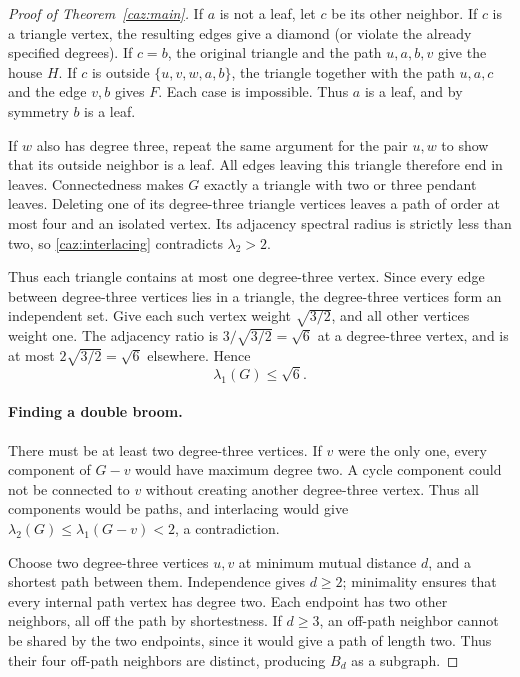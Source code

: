 \documentclass[11pt,a4paper]{article}
\numberwithin{equation}{section}
\theoremstyle{remark}
\begin{document}
\begin{proof}[Proof of Theorem~\ref{caz:main}]
If $a$ is not a leaf, let $c$ be its other neighbor. If $c$ is a
triangle vertex, the resulting edges give a diamond (or violate
the already specified degrees). If $c=b$, the original triangle
and the path $u,a,b,v$ give the house $H$. If $c$ is outside
$\{u,v,w,a,b\}$, the triangle together with the path $u,a,c$
and the edge $v,b$ gives $F$. Each case is impossible. Thus $a$
is a leaf, and by symmetry $b$ is a leaf.

If $w$ also has degree three, repeat the same argument for the
pair $u,w$ to show that its outside neighbor is a leaf. All edges
leaving this triangle therefore end in leaves. Connectedness
makes $G$ exactly a triangle with two or three pendant leaves.
Deleting one of its degree-three triangle vertices leaves a path
of order at most four and an isolated vertex. Its adjacency
spectral radius is strictly less than two, so
\eqref{caz:interlacing} contradicts $\lambda_2>2$.

Thus each triangle contains at most one degree-three vertex.
Since every edge between degree-three vertices lies in a
triangle, the degree-three vertices form an independent set.
Give each such vertex weight $\sqrt{3/2}$, and all other vertices
weight one. The adjacency ratio is $3/\sqrt{3/2}=\sqrt6$ at a
degree-three vertex, and is at most $2\sqrt{3/2}=\sqrt6$ elsewhere.
Hence
\begin{equation}
 \lambda_1(G)\le\sqrt6.
 \label{caz:second-perron}
\end{equation}

\paragraph{Finding a double broom.}
There must be at least two degree-three vertices. If $v$ were
the only one, every component of $G-v$ would have maximum degree
two. A cycle component could not be connected to $v$ without
creating another degree-three vertex. Thus all components would
be paths, and interlacing would give
$\lambda_2(G)\le\lambda_1(G-v)<2$, a contradiction.

Choose two degree-three vertices $u,v$ at minimum mutual distance
$d$, and a shortest path between them. Independence gives $d\ge2$;
minimality ensures that every internal path vertex has degree two.
Each endpoint has two other neighbors, all off the path by
shortestness. If $d\ge3$, an off-path neighbor cannot be shared by
the two endpoints, since it would give a path of length two.
Thus their four off-path neighbors are distinct, producing $B_d$
as a subgraph.


\end{proof}
\end{document}
